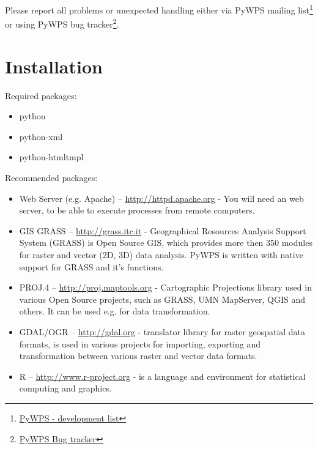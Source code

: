 \documentclass[a4paper,11pt]{report}
\begin{document}
Please report all problems or unexpected handling either via PyWPS mailing
list\footnote{\href{http://wald.intevation.org/mailman/listinfo/pywps-devel}{PyWPS
- development list}}
or using PyWPS
bug tracker\footnote{\href{http://wald.intevation.org/tracker/?atid=174&group\_id=22&func=browse}{PyWPS
Bug tracker}}.

\chapter{Installation}
\label{install}   
Required packages:
    
\begin{itemize}
    \item python 
    \item python-xml 
    \item python-htmltmpl 
\end{itemize}
    
Recommended packages:
    
\begin{itemize}
    \item Web Server (e.g. Apache) -- \url{http://httpd.apache.org} -  You
    will need an web server, to be able to execute processes from remote
    computers.

    \item GIS GRASS  -- \url{http://grass.itc.it} - Geographical Resources
    Analysis Support System (GRASS) is Open Source GIS, which provides more
    then 350 modules for raster and vector (2D, 3D) data analysis. PyWPS is
    written with native support for GRASS and it's functions.

    \item PROJ.4  -- \url{http://proj.maptools.org} - Cartographic
    Projections library used in various Open Source projects, such as
    GRASS, UMN MapServer, QGIS and others. It can be used e.g. for data
    transformation.

    \item GDAL/OGR  -- \url{http://gdal.org} - translator library for
    raster geospatial data formats, is used in various projects for
    importing, exporting and transformation between various raster and vector
    data formats.

    \item R  -- \url{http://www.r-project.org} - is a language and environment
    for statistical computing and graphics.

\end{itemize}
    
\end{document}

